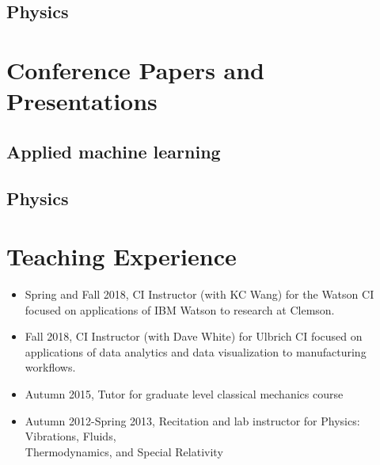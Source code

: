\documentclass[11pt,letterpaper,roman]{moderncv}        %
\begin{document}
\subsection{Physics}

\begin{refsection}
  \nocite{*}
  \printbibliography[heading=none]
\end{refsection}

\section{Conference Papers and Presentations}
\subsection{Applied machine learning}

\begin{refsection}
  \nocite{*}
  \printbibliography[heading=none]
\end{refsection}

\subsection{Physics}
\begin{refsection}
  \nocite{*}
  \printbibliography[heading=none]
\end{refsection}
      
\section{Teaching Experience}
{
  \begin{itemize}
  \item Spring and Fall 2018, CI Instructor (with KC Wang) for the Watson CI focused on applications of IBM Watson to research at Clemson.
  \item Fall 2018, CI Instructor (with Dave White) for Ulbrich CI focused on applications of data analytics and data visualization to manufacturing workflows.
    \end{itemize}
  }

{
\begin{itemize}
\item Autumn 2015, Tutor for graduate level classical mechanics course
\item Autumn 2012-Spring 2013, Recitation and lab instructor for Physics: Vibrations, Fluids,\\Thermodynamics, and Special Relativity
\end{itemize}
}
\end{document}
